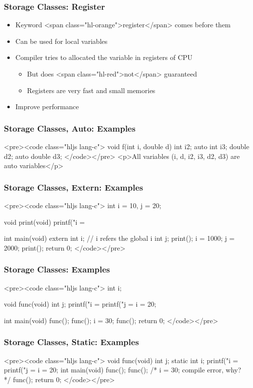 \documentclass{../c-lecture}
\begin{document}
\begin{frame}
  \frametitle{Storage Classes: Register}
  \begin{itemize}
    \item Keyword <span class="hl-orange">register</span> comes before them
    \item Can be used for local variables
    \item Compiler tries to allocated the variable in registers of CPU
    \begin{itemize}
      \item But does <span class="hl-red">not</span> guaranteed
      \item Registers are very fast and small memories
    \end{itemize}
    \item Improve performance
  \end{itemize}
\end{frame}
\begin{frame}
  \frametitle{Storage Classes, Auto: Examples}
  <pre><code class="hljs lang-c">
void f(int i, double d){
  int i2;
  auto int i3;
  double d2;
  auto double d3;
}
  </code></pre>
  <p>All variables (i, d, i2, i3, d2, d3) are auto variables</p>
\end{frame}
\begin{frame}
  \frametitle{Storage Classes, Extern: Examples}
  <pre><code class="hljs lang-c">
int i = 10, j = 20;

void print(void){
  printf("i = %
}

int main(void){
  extern int i; // i refers the global i
  int j;
  print();
  i = 1000;
  j = 2000;
  print();
  return 0;
}
  </code></pre>
\end{frame}

\begin{frame}[fragile]
  \frametitle{Storage Classes: Examples}
  <pre><code class="hljs lang-c">
int i;

void func(void){
  int j;
  printf("i = %
  printf("j = %
  i = 20;
}

int main(void){
  func();
  func();
  i = 30;
  func();
  return 0;
}
  </code></pre>
\end{frame}

\begin{frame}[fragile]
  \frametitle{Storage Classes, Static: Examples}
  <pre><code class="hljs lang-c">
void func(void){
  int j;
  static int i;
  printf("i = %
  printf("j = %
  i = 20;
}
int main(void){
  func();
  func();
  /* i = 30; compile error, why? */
  func();
  return 0;
}
  </code></pre>
\end{frame}
\end{document}
